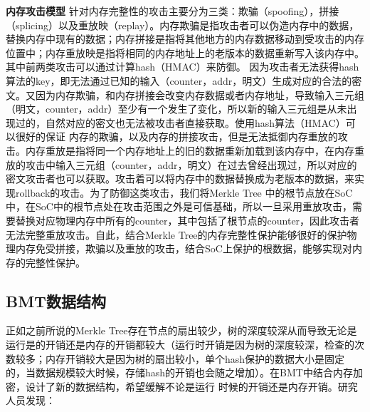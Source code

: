 \textbf{内存攻击模型}
针对内存完整性的攻击主要分为三类：欺骗（spoofing），拼接（splicing）以及重放映（replay）。内存欺骗是指攻击者可以伪造内存中的数据，替换内存中现有的数据；内存拼接是指将其他地方的内存数据移动到受攻击的内存位置中；内存重放映是指将相同的内存地址上的老版本的数据重新写入该内存中。其中前两类攻击可以通过计算hash（HMAC）来防御。
因为攻击者无法获得hash算法的key，即无法通过已知的输入（counter，addr，明文）生成对应的合法的密文。又因为内存欺骗，和内存拼接会改变内存数据或者内存地址，导致输入三元组（明文，counter，addr）至少有一个发生了变化，所以新的输入三元组是从未出现过的，自然对应的密文也无法被攻击者直接获取。使用hash算法（HMAC）可以很好的保证
内存的欺骗，以及内存的拼接攻击，但是无法抵御内存重放的攻击。内存重放是指将同一个内存地址上的旧的数据重新加载到该内存中，在内存重放的攻击中输入三元组（counter，addr，明文）在过去曾经出现过，所以对应的密文攻击者也可以获取。攻击着可以将内存中的数据替换成为老版本的数据，来实现rollback的攻击。为了防御这类攻击，我们将Merkle Tree
中的根节点放在SoC中，在SoC中的根节点处在攻击范围之外是可信基础，所以一旦采用重放攻击，需要替换对应物理内存中所有的counter，其中包括了根节点的counter，因此攻击者无法完整重放攻击。自此，结合Merkle Tree的内存完整性保护能够很好的保护物理内存免受拼接，欺骗以及重放的攻击，结合SoC上保护的根数据，能够实现对内存的完整性保护。

\subsection{BMT数据结构}
正如之前所说的Merkle Tree存在节点的扇出较少，树的深度较深从而导致无论是运行是的开销还是内存的开销都较大（运行时开销是因为树的深度较深，检查的次数较多；内存开销较大是因为树的扇出较小，单个hash保护的数据大小是固定的，当数据规模较大时候，存储hash的开销也会随之增加）。在BMT中结合内存加密，设计了新的数据结构，希望缓解不论是运行
时候的开销还是内存开销。研究人员发现：

